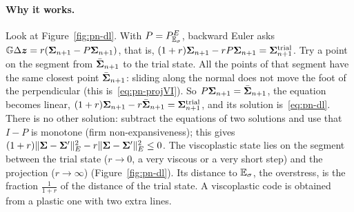 \paragraph{Why it works.} Look at Figure~\ref{fig:pn-dl}. With $P=P^E_{\mathbb{E}_{\sigma}}$,
backward Euler asks $\mathbb{G}\Delta\bm{z}=r(\bm{\Sigma}_{n+1}-P\bm{\Sigma}_{n+1})$, that is,
$(1+r)\bm{\Sigma}_{n+1}-rP\bm{\Sigma}_{n+1}=\bm{\Sigma}^{\mathrm{trial}}_{n+1}$. Try a point on the segment
from $\bar{\bm{\Sigma}}_{n+1}$ to the trial state. All the points of that segment have
the same closest point $\bar{\bm{\Sigma}}_{n+1}$: sliding along the normal does not move
the foot of the perpendicular (this is~\eqref{eq:pn-projVI}). So
$P\bm{\Sigma}_{n+1}=\bar{\bm{\Sigma}}_{n+1}$, the equation becomes linear,
$(1+r)\bm{\Sigma}_{n+1}-r\bar{\bm{\Sigma}}_{n+1}=\bm{\Sigma}^{\mathrm{trial}}_{n+1}$, and its solution
is~\eqref{eq:pn-dl}. There is no other solution: subtract the equations of two
solutions and use that $I-P$ is monotone (firm non-expansiveness); this gives
$(1+r)\lVert \bm{\Sigma}-\bm{\Sigma}'\rVert_E^2-r\lVert \bm{\Sigma}-\bm{\Sigma}'\rVert_E^2\le0$.
The viscoplastic state lies on the segment between the trial state ($r\to0$,
a very viscous or a very short step) and the projection ($r\to\infty$)
(Figure~\ref{fig:pn-dl}). Its distance to $\mathbb{E}_{\sigma}$, the overstress, is the fraction
$\displaystyle \frac{1}{1+r}$ of the distance of the trial state. A
viscoplastic code is obtained from a plastic one with two extra lines.

